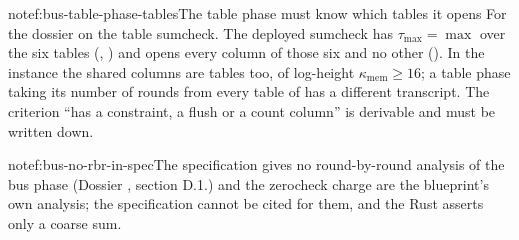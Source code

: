\begin{finding}{note}{f:bus-table-phase-tables}{The table phase must know which tables it opens}
For the dossier on the table sumcheck. The deployed sumcheck has $τ_{\max} = \max$ over the six
tables (, ) and opens every column of those six and no other
(). In the instance the shared columns are tables too, of log-height
$κ_{\mathrm{mem}} ≥ 16$; a table phase taking its number of rounds from every table of 
has a different transcript. The criterion ``has a constraint, a flush or a count column'' is
derivable and must be written down.
\end{finding}

\begin{finding}{note}{f:bus-no-rbr-in-spec}{The specification gives no round-by-round analysis of the bus phase}
(Dossier , section D.1.)  and the zerocheck charge are the
blueprint's own analysis; the specification cannot be cited for them, and the Rust asserts only a
coarse sum.
\end{finding}
